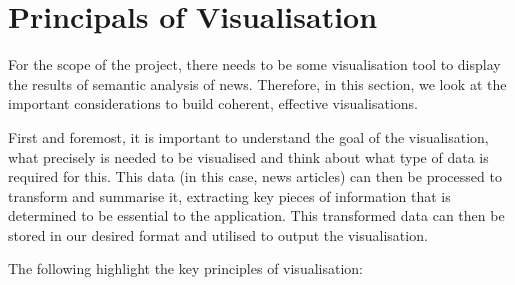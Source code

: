 

\section{Principals of Visualisation}

For the scope of the project, there needs to be some visualisation tool to display the results of semantic analysis of news. Therefore, in this section, we look at the important considerations to build  coherent, effective visualisations. 

First and foremost, it is important to understand the goal of the visualisation, what precisely is needed to be visualised and think about what type of data is required for this. This data (in this case, news articles) can then be processed to transform and summarise it, extracting key pieces of information that is determined to be essential to the application. This transformed data can then be stored in our desired format and utilised to output the visualisation.

The following highlight the key principles of visualisation:

